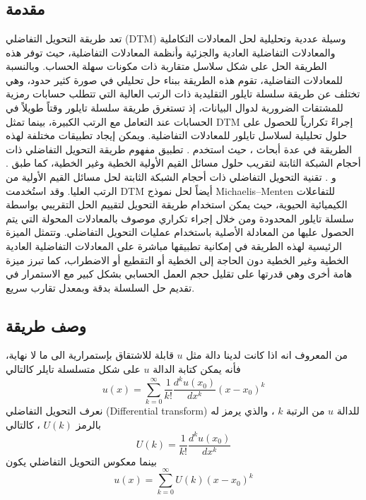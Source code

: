 \chapter{}

\section{مقدمة}
تعد طريقة التحويل التفاضلي (DTM) وسيلة عددية وتحليلية لحل المعادلات التكاملية \cite{6, 7, 8, 9} والمعادلات التفاضلية العادية والجزئية وأنظمة المعادلات التفاضلية، حيث توفر هذه الطريقة الحل على شكل سلاسل متقاربة ذات مكونات سهلة الحساب. وبالنسبة للمعادلات التفاضلية، تقوم هذه الطريقة ببناء حل تحليلي في صورة كثير حدود، وهي تختلف عن طريقة سلسلة تايلور التقليدية ذات الرتب العالية التي تتطلب حسابات رمزية للمشتقات الضرورية لدوال البيانات، إذ تستغرق طريقة سلسلة تايلور وقتاً طويلاً في الحسابات عند التعامل مع الرتب الكبيرة، بينما تمثل DTM إجراءً تكرارياً للحصول على حلول تحليلية لسلاسل تايلور للمعادلات التفاضلية. ويمكن إيجاد تطبيقات مختلفة لهذه الطريقة في عدة أبحاث \cite{6, 7, 8, 9, 10, 11}، حيث استخدم 
. \cite{9} تطبيق مفهوم طريقة التحويل التفاضلي ذات أحجام الشبكة الثابتة لتقريب حلول مسائل القيم الأولية الخطية وغير الخطية، كما طبق \linebreak {} \cite{8}. و  \cite{9}. تقنية التحويل التفاضلي ذات أحجام الشبكة الثابتة لحل مسائل القيم الأولية من الرتب العليا. وقد استُخدمت DTM أيضاً لحل نموذج Michaelis–Menten للتفاعلات الكيميائية الحيوية، حيث يمكن استخدام طريقة التحويل لتقييم الحل التقريبي بواسطة سلسلة تايلور المحدودة ومن خلال إجراء تكراري موصوف بالمعادلات المحولة التي يتم الحصول عليها من المعادلة الأصلية باستخدام عمليات التحويل التفاضلي. وتتمثل الميزة الرئيسية لهذه الطريقة في إمكانية تطبيقها مباشرة على المعادلات التفاضلية العادية الخطية وغير الخطية دون الحاجة إلى الخطية أو التقطيع أو الاضطراب، كما تبرز ميزة هامة أخرى وهي قدرتها على تقليل حجم العمل الحسابي بشكل كبير مع الاستمرار في تقديم حل السلسلة بدقة وبمعدل تقارب سريع.

\section{وصف طريقة }
من  المعروف انه اذا كانت لدينا دالة مثل $u$ قابلة للاشتقاق بإستمرارية الى ما لا نهاية، فأنه يمكن كتابة الدالة $u$ على شكل متسلسلة تايلر كالتالي
\begin{equation}
	u(x) = \sum_{k=0}^{\infty} \frac{1}{k!} \frac{d^k u(x_0)}{dx^k} (x - x_0)^k
\end{equation}
نعرف التحويل التفاضلي (Differential transform) للدالة $u$ من الرتبة $k$ ، والذي يرمز له بالرمز $U(k)$ ، كالتالي
\begin{equation}
	U(k) = \frac{1}{k!} \frac{d^k u(x_0)}{dx^k}
\end{equation}
بينما معكوس التحويل التفاضلي يكون
\begin{equation}
	u(x) = \sum_{k=0}^{\infty} U(k) (x - x_0)^k
\end{equation}

